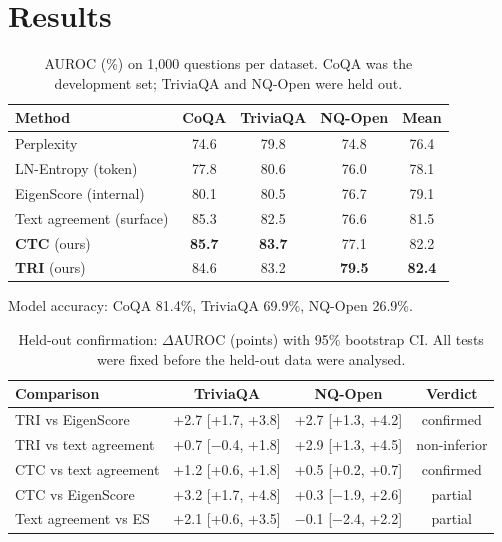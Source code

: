 \documentclass[journal]{IEEEtran}
\begin{document}
\section{Results}
\begin{table}[t]
\centering
\caption{AUROC (\%) on 1{,}000 questions per dataset. CoQA was the development set; TriviaQA and NQ-Open were held out.}
\label{tab:auroc}
\small
\setlength{\tabcolsep}{4pt}
\begin{tabular}{@{}lcccc@{}}
\toprule
Method & CoQA & TriviaQA & NQ-Open & Mean \\
\midrule
Perplexity & 74.6 & 79.8 & 74.8 & 76.4 \\
LN-Entropy (token) & 77.8 & 80.6 & 76.0 & 78.1 \\
EigenScore (internal)~\cite{chen2024inside} & 80.1 & 80.5 & 76.7 & 79.1 \\
Text agreement (surface) & 85.3 & 82.5 & 76.6 & 81.5 \\
\midrule
\textbf{CTC} (ours) & \textbf{85.7} & \textbf{83.7} & 77.1 & 82.2 \\
\textbf{TRI} (ours) & 84.6 & 83.2 & \textbf{79.5} & \textbf{82.4} \\
\bottomrule
\end{tabular}
\vspace{2pt}
\footnotesize Model accuracy: CoQA 81.4\%, TriviaQA 69.9\%, NQ-Open 26.9\%.
\end{table}

\begin{table}[t]
\centering
\caption{Held-out confirmation: $\Delta$AUROC (points) with 95\% bootstrap CI. All tests were fixed before the held-out data were analysed.}
\label{tab:held}
\footnotesize
\setlength{\tabcolsep}{2pt}
\begin{tabular}{@{}lccc@{}}
\toprule
Comparison & TriviaQA & NQ-Open & Verdict \\
\midrule
TRI vs EigenScore & +2.7 [+1.7, +3.8] & +2.7 [+1.3, +4.2] & confirmed \\
TRI vs text agreement & +0.7 [$-$0.4, +1.8] & +2.9 [+1.3, +4.5] & non-inferior \\
CTC vs text agreement & +1.2 [+0.6, +1.8] & +0.5 [+0.2, +0.7] & confirmed \\
CTC vs EigenScore & +3.2 [+1.7, +4.8] & +0.3 [$-$1.9, +2.6] & partial \\
Text agreement vs ES & +2.1 [+0.6, +3.5] & $-$0.1 [$-$2.4, +2.2] & partial \\
\bottomrule
\end{tabular}
\end{table}
\end{document}
